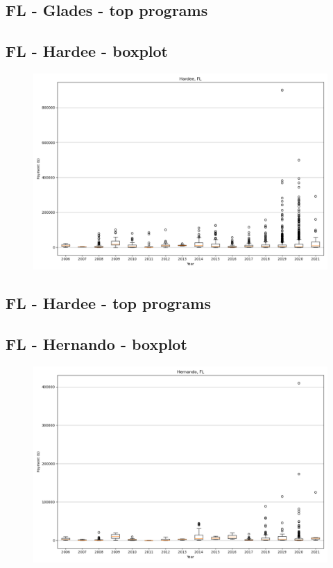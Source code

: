 \subsection*{FL - Glades - top programs}

\newpage
\subsection*{FL - Hardee - boxplot}
\begin{figure}[h]
\centering
\includegraphics[width=7in]{../output/boxplots/counties/Hardee-FL_boxplot.png}
\end{figure}


\subsection*{FL - Hardee - top programs}

\newpage
\subsection*{FL - Hernando - boxplot}
\begin{figure}[h]
\centering
\includegraphics[width=7in]{../output/boxplots/counties/Hernando-FL_boxplot.png}
\end{figure}


